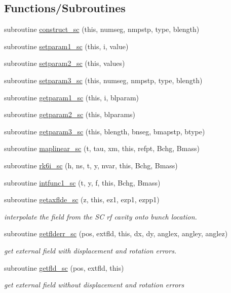 \subsection*{Functions/\+Subroutines}
\begin{DoxyCompactItemize}
\item 
subroutine \mbox{\hyperlink{namespacescclass_a117b083b5a5a59d050fe5c0a4771332b}{construct\+\_\+sc}} (this, numseg, nmpstp, type, blength)
\item 
subroutine \mbox{\hyperlink{namespacescclass_a23a57a64ee6a74149bbc9cf009ce8711}{setparam1\+\_\+sc}} (this, i, value)
\item 
subroutine \mbox{\hyperlink{namespacescclass_af35b79ac06dc2b6bec2d97f6e745ab20}{setparam2\+\_\+sc}} (this, values)
\item 
subroutine \mbox{\hyperlink{namespacescclass_a656d4cc4d5fe872ffa9df12bab721bec}{setparam3\+\_\+sc}} (this, numseg, nmpstp, type, blength)
\item 
subroutine \mbox{\hyperlink{namespacescclass_a5f02207aa4bb28b292bf39bd5876c7e2}{getparam1\+\_\+sc}} (this, i, blparam)
\item 
subroutine \mbox{\hyperlink{namespacescclass_a036860e8ca9dff4cc79e19ec6c55f86a}{getparam2\+\_\+sc}} (this, blparams)
\item 
subroutine \mbox{\hyperlink{namespacescclass_aaa829fed79c7f89ac09b012687895817}{getparam3\+\_\+sc}} (this, blength, bnseg, bmapstp, btype)
\item 
subroutine \mbox{\hyperlink{namespacescclass_aec786348c1a0beec0d090c12b13d588c}{maplinear\+\_\+sc}} (t, tau, xm, this, refpt, Bchg, Bmass)
\item 
subroutine \mbox{\hyperlink{namespacescclass_a4b16987e1d3852123c69a6bfc0cec75a}{rk6i\+\_\+sc}} (h, ns, t, y, nvar, this, Bchg, Bmass)
\item 
subroutine \mbox{\hyperlink{namespacescclass_a5d354b33de72df0b6be68290744f94ba}{intfunc1\+\_\+sc}} (t, y, f, this, Bchg, Bmass)
\item 
subroutine \mbox{\hyperlink{namespacescclass_aefc9ea62cf36830e2c74869fff2f1b17}{getaxflde\+\_\+sc}} (z, this, ez1, ezp1, ezpp1)
\begin{DoxyCompactList}\small\item\em interpolate the field from the SC rf cavity onto bunch location. \end{DoxyCompactList}\item 
subroutine \mbox{\hyperlink{namespacescclass_abe42c84df8190cc0443752dff296dd89}{getflderr\+\_\+sc}} (pos, extfld, this, dx, dy, anglex, angley, anglez)
\begin{DoxyCompactList}\small\item\em get external field with displacement and rotation errors. \end{DoxyCompactList}\item 
subroutine \mbox{\hyperlink{namespacescclass_a5af81e94b531e8d02789525f1f4438ac}{getfld\+\_\+sc}} (pos, extfld, this)
\begin{DoxyCompactList}\small\item\em get external field without displacement and rotation errors \end{DoxyCompactList}\end{DoxyCompactItemize}

